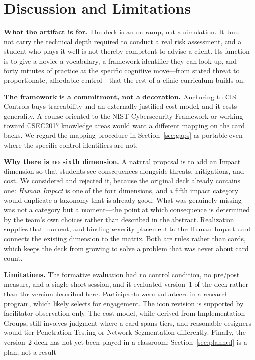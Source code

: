 \documentclass[10pt,twocolumn,letterpaper]{article}
\begin{document}
\section{Discussion and Limitations}
\label{sec:discussion}

\textbf{What the artifact is for.} The deck is an on-ramp, not a simulation. It
does not carry the technical depth required to conduct a real risk assessment,
and a student who plays it well is not thereby competent to advise a client. Its
function is to give a novice a vocabulary, a framework identifier they can look
up, and forty minutes of practice at the specific cognitive move---from stated
threat to proportionate, affordable control---that the rest of a clinic
curriculum builds on.

\textbf{The framework is a commitment, not a decoration.} Anchoring to CIS
Controls buys traceability and an externally justified cost model, and it costs
generality. A course oriented to the NIST Cybersecurity Framework
\cite{nist_csf2} or working toward CSEC2017 knowledge areas \cite{csec2017}
would want a different mapping on the card backs. We regard the mapping
procedure in Section~\ref{sec:gaps} as portable even where the specific control
identifiers are not.

\textbf{Why there is no sixth dimension.} A natural proposal is to add an
Impact dimension so that students see consequences alongside threats,
mitigations, and cost. We considered and rejected it, because the original deck
already contains one: \emph{Human Impact} is one of the four dimensions, and a
fifth impact category would duplicate a taxonomy that is already good. What was
genuinely missing was not a category but a moment---the point at which
consequence is determined by the team's own choices rather than described in the
abstract. Realization supplies that moment, and binding severity placement to
the Human Impact card connects the existing dimension to the matrix. Both are
rules rather than cards, which keeps the deck from growing to solve a problem
that was never about card count.

\textbf{Limitations.} The formative evaluation had no control condition, no
pre/post measure, and a single short session, and it evaluated version~1 of the
deck rather than the version described here. Participants were volunteers in a
research program, which likely selects for engagement. The icon revision is
supported by facilitator observation only. The cost model, while derived from
Implementation Groups, still involves judgment where a card spans tiers, and
reasonable designers would tier Penetration Testing or Network Segmentation
differently. Finally, the version~2 deck has not yet been played in a
classroom; Section~\ref{sec:planned} is a plan, not a result.
\end{document}

